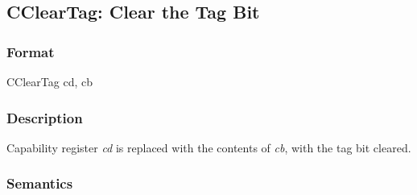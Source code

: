 \clearpage
{}
{}
\subsection*{CClearTag: Clear the Tag Bit}

\subsubsection*{Format}

CClearTag cd, cb

\begin{center}
\end{center}

\subsubsection*{Description}

Capability register \emph{cd} is replaced with the contents of \emph{cb}, with
the tag bit cleared.

\subsubsection*{Semantics}



